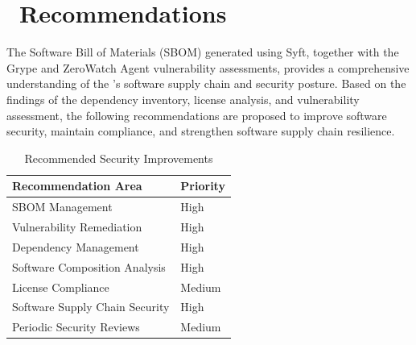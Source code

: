 
\chapter[Recommendations]{\IconLightbulb\ Recommendations}

The Software Bill of Materials (SBOM) generated using Syft, together with the Grype and ZeroWatch Agent vulnerability assessments, provides a comprehensive understanding of the \textbf{\ProjectName}'s software supply chain and security posture. Based on the findings of the dependency inventory, license analysis, and vulnerability assessment, the following recommendations are proposed to improve software security, maintain compliance, and strengthen software supply chain resilience.

\vspace{0.4cm}


\begin{table}[H]
\centering
\small
\renewcommand{\arraystretch}{1.3}

\begin{tabular}{p{5cm}p{8cm}}
\toprule
\rowcolor{ZWPrimary}
\textbf{\color{white}Recommendation Area} & \textbf{\color{white}Priority} \\
\midrule
SBOM Management & High \\
Vulnerability Remediation & High \\
Dependency Management & High \\
Software Composition Analysis & High \\
License Compliance & Medium \\
Software Supply Chain Security & High \\
Periodic Security Reviews & Medium \\
\bottomrule
\end{tabular}
\caption{Recommended Security Improvements}
\end{table}

\vspace{0.4cm}


